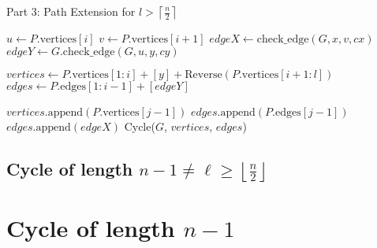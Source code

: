 \begin{algorithm}[H]
    \caption{Part 3: Path Extension for \( l > \left \lceil \frac{n}{2} \right \rceil \)}
    \begin{algorithmic}[1]
                \State $u \gets P.\text{vertices}[i]$
                \State $v \gets P.\text{vertices}[i + 1]$
                \State $edgeX \gets \text{check\_edge}(G, x, v, cx)$
                \State $edgeY \gets G.\text{check\_edge}(G, u, y, cy)$

                    \State $vertices \gets P.\text{vertices}[1:i] + [y] + \text{Reverse}(P.\text{vertices}[i + 1:l])$
                    \State $edges \gets P.\text{edges}[1:i - 1] + [edgeY]$

                        \State $vertices.\text{append}(P.\text{vertices}[j - 1])$
                        \State $edges.\text{append}(P.\text{edges}[j - 1])$
                    \EndFor
                    \State $edges.\text{append}(edgeX)$ 
                    \State \Return Cycle($G$, $vertices$, $edges$)
                \EndIf
            \EndFor
            \State \Return {} 
        \EndFunction
    \end{algorithmic}
\end{algorithm}



\subsection{Cycle of length $n - 1 \neq \ell \geq \left \lfloor \frac{n}{2} \right \rfloor$}

\section{Cycle of length $n - 1$}


